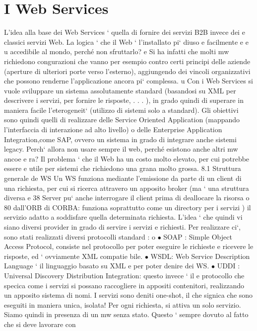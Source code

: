 \documentclass[a4paper,12pt]{article}
\begin{document}
\section{I Web Services}
L'idea alla base dei Web Services ` quella di fornire dei servizi B2B invece dei
e
classici servizi Web. La logica ` che il Web ` l'installato pi` diuso e facilmente
e
e
u
accedibile al mondo, perché non sfruttarlo?
e
Si ha infatti che molti mw richiedono congurazioni che vanno per esempio
contro certi principi delle aziende (aperture di ulteriori porte verso l'esterno),
aggiungendo dei vincoli organizzativi che possono renderne l'applicazione ancora
pi` complessa.
u
Con i Web Services si vuole sviluppare un sistema assolutamente standard
(basandosi su XML per descrivere i servizi, per fornire le risposte, . . . ), in grado quindi di superare in maniera
facile l'eterogeneit` (utilizzo di sistemi solo
a
standard). Gli obiettivi sono quindi quelli di realizzare delle Service Oriented
Application (mappando l'interfaccia di interazione ad alto livello) o delle Enterprise Application Integration,come SAP,
ovvero un sistema in grado di integrare
anche sistemi legacy.
Perch` allora non usare sempre il web, perché esistono anche altri mw ancoe
e
ra? Il problema ` che il Web ha un costo molto elevato, per cui potrebbe essere
e
utile per sistemi che richiedono una grana molto grossa.
8.1
Struttura generale de WS
Un WS funziona mediante l'emissione da parte di un client di una richiesta,
per cui si ricerca attravero un apposito broker (ma ` una struttura diversa
e
38 Server
pu` anche interrogare il client prima di deallocare la risorsa
o
80
dall'ORB di CORBA: funziona soprattutto come un directory per i servizi ) il
servizio adatto a soddisfare quella determinata richiesta.
L'idea ` che quindi vi siano diversi provider in grado di servire i servizi
e
richiesti. Per realizzare ci`, sono stati realizzati diversi protocolli standard :
o
$\bullet$ SOAP : Simple Object Access Protocol, consiste nel protocollo per poter
eseguire le richieste e ricevere le risposte, ed ` ovviamente XML compatie
bile.
$\bullet$ WSDL: Web Service Description Language ` il linguaggio basato su XML
e
per poter denire dei WS.
$\bullet$ UDDI : Universal Discovery Distribution Integration: questo invece ` il
e
protocollo che specica come i servizi si possano raccogliere in appositi
contenitori, realizzando un apposito sistema di nomi.
I servizi sono deniti one-shot, il che signica che sono eseguiti in maniera unica,
isolata! Per ogni richiesta, si attiva un solo servizio. Siamo quindi in presenza
di un mw senza stato. Questo ` sempre dovuto al fatto che si deve lavorare con
\end{document}
